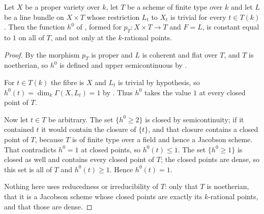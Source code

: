 \begin{lemma}\label{lem:cube-h0-constant}
Let $X$ be a proper variety over $k$, let $T$ be a scheme of finite type over
$k$ and let $L$ be a line bundle on $X\times T$ whose restriction $L_t$ to
$X_t$ is trivial for every $t\in T(k)$.  Then the function $h^0$ of
, formed for $p_T\colon X\times T\to T$ and
$F=L$, is constant equal to $1$ on all of $T$, and not only at the
$k$-rational points.
\end{lemma}
\begin{proof}
By  the morphism $p_T$ is proper and
$L$ is coherent and flat over $T$, and $T$ is noetherian, so $h^0$ is defined
and upper semicontinuous by .

For $t\in T(k)$ the fibre is $X$ and $L_t$ is trivial by hypothesis, so
$h^0(t)=\dim_k\Gamma(X,L_t)=1$ by .  Thus
$h^0$ takes the value $1$ at every closed point of $T$.

Now let $t\in T$ be arbitrary.  The set $\{h^0\geq2\}$ is closed by
semicontinuity; if it contained $t$ it would contain the closure of $\{t\}$,
and that closure contains a closed point of $T$, because $T$ is of finite type
over a field and hence a Jacobson scheme.  That contradicts $h^0=1$ at closed
points, so $h^0(t)\leq1$.  The set $\{h^0\geq1\}$ is closed as well and
contains every closed point of $T$; the closed points are dense, so this set
is all of $T$ and $h^0(t)\geq1$.  Hence $h^0(t)=1$.

Nothing here uses reducedness or irreducibility of $T$: only that $T$ is
noetherian, that it is a Jacobson scheme whose closed points are exactly its
$k$-rational points, and that those are dense.
\end{proof}


